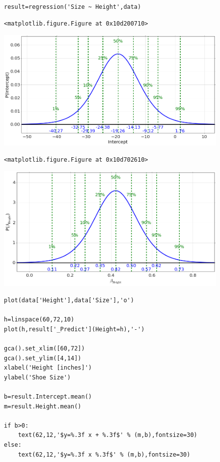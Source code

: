 \begin{lstlisting}
result=regression('Size ~ Height',data)
\end{lstlisting}

\begin{verbatim}
<matplotlib.figure.Figure at 0x10d200710>\end{verbatim}

\begin{center}\includegraphics[width=4.5in]{Regression/Regression_fig1.png}\end{center}

\begin{verbatim}
<matplotlib.figure.Figure at 0x10d702610>\end{verbatim}

\begin{center}\includegraphics[width=4.5in]{Regression/Regression_fig2.png}\end{center}

\begin{lstlisting}
plot(data['Height'],data['Size'],'o')

h=linspace(60,72,10)
plot(h,result['_Predict'](Height=h),'-')

gca().set_xlim([60,72])
gca().set_ylim([4,14])
xlabel('Height [inches]')
ylabel('Shoe Size')

b=result.Intercept.mean()
m=result.Height.mean()

if b>0:
    text(62,12,'$y=%.3f x + %.3f$' % (m,b),fontsize=30)
else:
    text(62,12,'$y=%.3f x %.3f$' % (m,b),fontsize=30)
\end{lstlisting}

